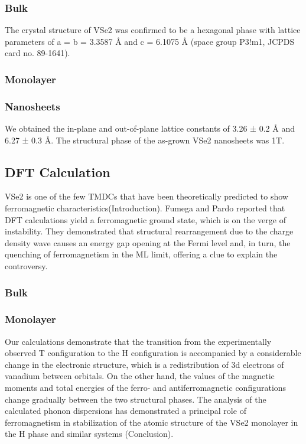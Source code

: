\subsubsection{Bulk}
The crystal structure of VSe2 was confirmed to be a hexagonal phase with lattice parameters of a = b = 3.3587 Å and c = 6.1075 Å (space group P3!m1, JCPDS card no. 89-1641)\cite{C8NR09258C}.
\subsubsection{Monolayer}

\subsubsection{Nanosheets}
We obtained the in-plane and out-of-plane lattice constants of 3.26 ± 0.2 Å and 6.27 ± 0.3 Å. The structural phase of the as-grown VSe2 nanosheets was 1T\cite{C8NR09258C}.
\subsection{DFT Calculation}
VSe2 is one of the few TMDCs that have been theoretically predicted to show ferromagnetic characteristics\cite{C8NR09258C}(Introduction). Fumega and Pardo reported that DFT calculations yield a ferromagnetic ground state, which is on the verge of instability. They demonstrated that structural rearrangement due to the charge density wave causes an energy gap opening at the Fermi level and, in turn, the quenching of ferromagnetism in the ML limit, offering a clue to explain the controversy\cite{doi:10.1021/acsnano.9b02996}. 
\subsubsection{Bulk}

\subsubsection{Monolayer}
Our calculations demonstrate that the transition from the experimentally observed T configuration to the H configuration is accompanied by a considerable change in the electronic structure, which is a redistribution of 3d electrons of vanadium between orbitals. On the other hand, the values of the magnetic moments and total energies of the ferro- and antiferromagnetic configurations change gradually between the two structural phases. The analysis of the calculated phonon dispersions has demonstrated a principal role of ferromagnetism in stabilization of the atomic structure of the VSe2 monolayer in the H phase and similar systems \cite{C9CP03726H}(Conclusion).

